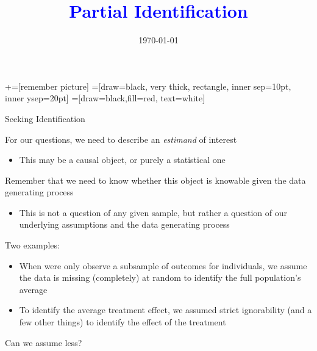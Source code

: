 \documentclass[notes,11pt, aspectratio=169]{beamer}
\title[]{\textcolor{blue}{Partial Identification}} \author[PGP]{}
\institute[FRBNY]{\small{\begin{tabular}{c}
                           Paul Goldsmith-Pinkham  \\
\end{tabular}}}
\date{\today}
\newenvironment{wideitemize}{\itemize\addtolength{\itemsep}{10pt}}{\enditemize}
\begin{document}
\newcommand\marktopleft[1]{%
    \tikz[overlay,remember picture] 
        \node (marker-#1-a) at (-.3em,.3em) {};%
}
\newcommand\markbottomright[2]{%
    \tikz[overlay,remember picture] 
        \node (marker-#1-b) at (0em,0em) {};%
}
+=[remember picture] 
 =[draw=black, very thick, rectangle, inner sep=10pt, inner ysep=20pt]
 =[draw=black,fill=red, text=white]

\begin{frame}
\maketitle
\end{frame}

\begin{frame}{Seeking Identification}
  \begin{wideitemize}
  \item For our questions, we need to describe an \emph{estimand} of
    interest
    \begin{itemize}
    \item This may be a causal object, or purely a statistical one
    \end{itemize}
    \item Remember that we need to know whether this object is knowable
      given the data generating process
      \begin{itemize}
      \item This is not a question of any given sample, but rather a
        question of our underlying assumptions and the data generating
        process
      \end{itemize}
    \item Two examples:
      \begin{itemize}
      \item When were only observe a subsample of outcomes for
        individuals, we assume the data is missing (completely) at
        random to identify the full population's average
      \item To identify the average treatment effect, we
        assumed strict ignorability (and a few other things) to
        identify the effect of the treatment
      \end{itemize}
    \item Can we assume less?
  \end{wideitemize}
\end{frame}
\end{document}
